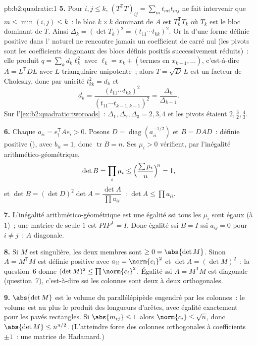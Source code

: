 \begin{solution}{pb:b2:quadratic:1}
\textbf{5.} Pour $i, j \leq k$, $(T^{\mathsf T}T)_{ij} = \sum_m
t_{mi}t_{mj}$ ne fait intervenir que $m \leq \min(i,j) \leq k$~: le
bloc $k\times k$ dominant de $A$ est $T_k^{\mathsf T}T_k$ où
$T_k$ est le bloc dominant de $T$. Ainsi $\Delta_k = (\det T_k)^2
= (t_{11}\cdots t_{kk})^2$. Or la  d'une
forme définie positive dans l' naturel ne rencontre jamais un
coefficient de carré nul (les pivots sont les coefficients
diagonaux des blocs définis positifs successivement réduits)~: elle
produit $q = \sum_k d_k\ell_k^2$ avec $\ell_k = x_k + (\text{termes
en } x_{k+1}, \dots)$, c'est-à-dire $A = L^{\mathsf T}DL$ avec $L$
triangulaire unipotente~; alors $T = \sqrt D\,L$ est un facteur de
Cholesky, donc par unicité $t_{kk}^2 = d_k$ et
\[
d_k = \frac{(t_{11}\cdots t_{kk})^2}
{(t_{11}\cdots t_{k-1,k-1})^2}
= \frac{\Delta_k}{\Delta_{k-1}} .
\]
Sur l'\cref{ex:b2:quadratic:tworoads}~: $\Delta_1, \Delta_2,
\Delta_3 = 2, 3, 4$ et les pivots étaient $2, \frac32, \frac43$.

\textbf{6.} Chaque $a_{ii} = e_i^{\mathsf T}Ae_i > 0$. Posons $D =
\operatorname{diag}(a_{ii}^{-1/2})$ et $B = DAD$~: définie
positive (), avec $b_{ii} = 1$, donc $\operatorname{tr}
B = n$. Ses  $\mu_i > 0$ vérifient, par l'inégalité
arithmético-géométrique,
\[
\det B = \prod_i\mu_i
\leq \Bigl(\frac{\sum\mu_i}{n}\Bigr)^{\!n} = 1 ,
\]
et $\det B = (\det D)^2\det A = \dfrac{\det A}{\prod
a_{ii}}$~: $\det A \leq \prod a_{ii}$.

\textbf{7.} L'inégalité arithmético-géométrique est une égalité ssi
tous les $\mu_i$ sont égaux (à $1$)~; une matrice  de
seule  $1$ est $PIP^{\mathsf T} = I$. Donc égalité ssi
$B = I$ ssi $a_{ij} = 0$ pour $i \neq j$~: $A$ diagonale.

\textbf{8.} Si $M$ est singulière, les deux membres sont $\geq 0 =
\abs{\det M}$. Sinon $A = M^{\mathsf T}M$ est définie positive avec
$a_{ii} = \norm{c_i}^2$ et $\det A = (\det M)^2$~: la question~6
donne $(\det M)^2 \leq \prod\norm{c_i}^2$. Égalité ssi $A =
M^{\mathsf T}M$ est diagonale (question~7), c'est-à-dire ssi les
colonnes sont deux à deux orthogonales.

\textbf{9.} $\abs{\det M}$ est le volume du parallélépipède
engendré par les colonnes~: le volume est au plus le produit des
longueurs d'arêtes, avec égalité exactement pour les pavés
rectangles. Si $\abs{m_{ij}} \leq 1$ alors $\norm{c_i} \leq \sqrt
n$, donc $\abs{\det M} \leq n^{n/2}$. (L'atteindre force des
colonnes orthogonales à coefficients $\pm1$~: une matrice de
Hadamard.)


\end{solution}
